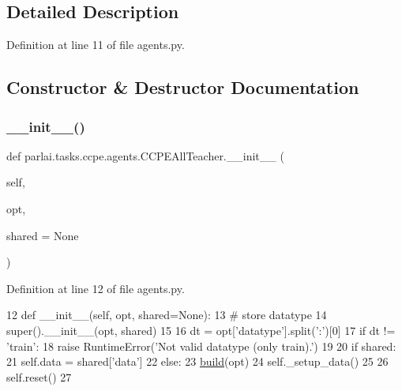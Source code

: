 \subsection{Detailed Description}


Definition at line 11 of file agents.\+py.



\subsection{Constructor \& Destructor Documentation}
\mbox{\label{classparlai_1_1tasks_1_1ccpe_1_1agents_1_1CCPEAllTeacher_a7740c7de97e893e02c37bd64eccc3876}} 
\subsubsection{\texorpdfstring{\+\_\+\+\_\+init\+\_\+\+\_\+()}{\_\_init\_\_()}}
{\footnotesize\ttfamily def parlai.\+tasks.\+ccpe.\+agents.\+C\+C\+P\+E\+All\+Teacher.\+\_\+\+\_\+init\+\_\+\+\_\+ (\begin{DoxyParamCaption}\item[{}]{self,  }\item[{}]{opt,  }\item[{}]{shared = {\ttfamily None} }\end{DoxyParamCaption})}



Definition at line 12 of file agents.\+py.


\begin{DoxyCode}
12     \textcolor{keyword}{def }\_\_init\_\_(self, opt, shared=None):
13         \textcolor{comment}{# store datatype}
14         super().\_\_init\_\_(opt, shared)
15 
16         dt = opt[\textcolor{stringliteral}{'datatype'}].split(\textcolor{stringliteral}{':'})[0]
17         \textcolor{keywordflow}{if} dt != \textcolor{stringliteral}{'train'}:
18             \textcolor{keywordflow}{raise} RuntimeError(\textcolor{stringliteral}{'Not valid datatype (only train).'})
19 
20         \textcolor{keywordflow}{if} shared:
21             self.data = shared[\textcolor{stringliteral}{'data'}]
22         \textcolor{keywordflow}{else}:
23             \hyperlink{namespaceparlai_1_1mturk_1_1tasks_1_1talkthewalk_1_1download_a8c0fbb9b6dfe127cb8c1bd6e7c4e33fd}{build}(opt)
24             self.\_setup\_data()
25 
26         self.reset()
27 
\end{DoxyCode}


